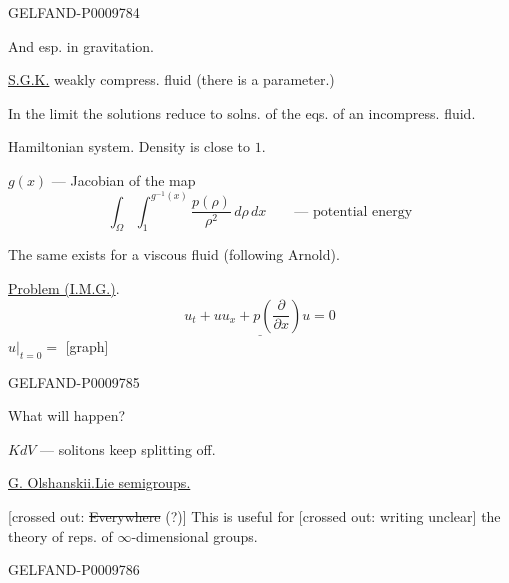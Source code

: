 \begin{GelfandAdjacentEvidence}{GELFAND-P000978}{4}


And esp. in gravitation.

\underline{S.G.K.} weakly compress. fluid (there is a parameter.)

In the limit the solutions reduce to solns. of the eqs. of an incompress. fluid.

Hamiltonian system. Density is close to $1$.

$g(x)$ --- Jacobian of the map
\[
 \int_\Omega\int_1^{g^{-1}(x)}\frac{p(\rho)}{\rho^2}\,d\rho\,dx
 \qquad\text{--- potential energy}
\]

The same exists for a viscous fluid (following Arnold).

\underline{Problem (I.M.G.)}.
\[
 \underline{u_t+uu_x+p\left(\frac{\partial}{\partial x}\right)u=0}
\]
$u|_{t=0}={}$ [graph]
\end{GelfandAdjacentEvidence}
\begin{GelfandAdjacentEvidence}{GELFAND-P000978}{5}


What will happen?

$KdV$ --- solitons keep splitting off.

\underline{\underline{G. Olshanskii.}}\quad\underline{Lie semigroups.}

[crossed out: \sout{Everywhere} (?)] This is useful for
[crossed out: writing unclear] the theory of reps. of $\infty$-dimensional groups.
\end{GelfandAdjacentEvidence}
\begin{GelfandAdjacentEvidence}{GELFAND-P000978}{6}

\end{GelfandAdjacentEvidence}
